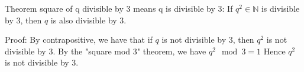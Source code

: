 Theorem square of q divisible by 3 means q is divisible by 3:
If $q^2 \in \mathbb{N}$ is divisible by $3$, then $q$ is also divisible by $3$.


Proof:
By contrapositive, we have that if $q$ is not divisible by $3$, then $q^2$ is not divisible by $3$.
By the "square mod 3" theorem, we have $q^2 \mod 3 = 1$
Hence $q^2$ is not divisible by $3$.